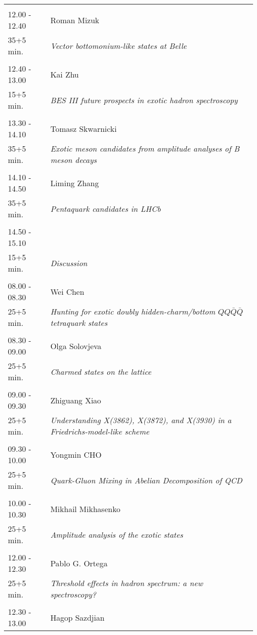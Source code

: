 \begin{longtable}{p{3cm}p{13cm}}
 & \\ 
12.00 - 12.40 & Roman Mizuk\\ 
35+5 min. & {\it Vector bottomonium-like states at Belle}\\ 
 & \\ 
12.40 - 13.00 & Kai Zhu\\ 
15+5 min. & {\it BES III future prospects in exotic hadron spectroscopy}\\ 
 & \\ 
13.30 - 14.10 & Tomasz Skwarnicki\\ 
35+5 min. & {\it Exotic meson candidates from amplitude analyses of B meson decays}\\ 
 & \\ 
14.10 - 14.50 & Liming Zhang\\ 
35+5 min. & {\it Pentaquark candidates in LHCb}\\ 
 & \\ 
14.50 - 15.10 & \\ 
15+5 min. & {\it Discussion}\\ 
 & \\ 
08.00 - 08.30 & Wei Chen\\ 
25+5 min. & {\it Hunting for exotic doubly hidden-charm/bottom $QQ\bar Q\bar Q$ tetraquark states}\\ 
 & \\ 
08.30 - 09.00 & Olga Solovjeva\\ 
25+5 min. & {\it Charmed states on the lattice}\\ 
 & \\ 
09.00 - 09.30 & Zhiguang Xiao\\ 
25+5 min. & {\it Understanding X(3862), X(3872), and X(3930) in a Friedrichs-model-like scheme}\\ 
 & \\ 
09.30 - 10.00 & Yongmin CHO\\ 
25+5 min. & {\it Quark-Gluon Mixing in Abelian Decomposition of QCD}\\ 
 & \\ 
10.00 - 10.30 & Mikhail Mikhasenko\\ 
25+5 min. & {\it Amplitude analysis of the exotic states}\\ 
 & \\ 
12.00 - 12.30 & Pablo G. Ortega\\ 
25+5 min. & {\it Threshold effects in hadron spectrum: a new spectroscopy?}\\ 
 & \\ 
12.30 - 13.00 & Hagop Sazdjian\\ 

\end{longtable}
